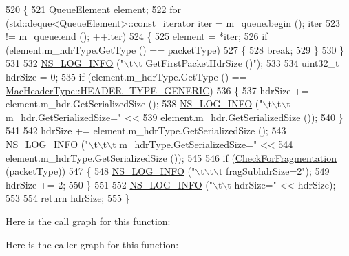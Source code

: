 \begin{DoxyCode}
520 \{
521   QueueElement element;
522   \textcolor{keywordflow}{for} (std::deque<QueueElement>::const\_iterator iter = \hyperlink{classns3_1_1WimaxMacQueue_ad372c20acfe0acf6df6280662d63bdae}{m\_queue}.begin (); iter
523        != \hyperlink{classns3_1_1WimaxMacQueue_ad372c20acfe0acf6df6280662d63bdae}{m\_queue}.end (); ++iter)
524     \{
525       element = *iter;
526       \textcolor{keywordflow}{if} (element.m\_hdrType.GetType () == packetType)
527         \{
528           \textcolor{keywordflow}{break};
529         \}
530     \}
531 
532   \hyperlink{group__logging_gafbd73ee2cf9f26b319f49086d8e860fb}{NS\_LOG\_INFO} (\textcolor{stringliteral}{"\(\backslash\)t\(\backslash\)t GetFirstPacketHdrSize ()"});
533 
534   uint32\_t hdrSize = 0;
535   \textcolor{keywordflow}{if} (element.m\_hdrType.GetType () == \hyperlink{classns3_1_1MacHeaderType_a54d8fc8bc93a2b7865627965cdd31c20a48fe5b2f20cadf78008c71469b518403}{MacHeaderType::HEADER\_TYPE\_GENERIC})
536     \{
537       hdrSize += element.m\_hdr.GetSerializedSize ();
538       \hyperlink{group__logging_gafbd73ee2cf9f26b319f49086d8e860fb}{NS\_LOG\_INFO} (\textcolor{stringliteral}{"\(\backslash\)t\(\backslash\)t\(\backslash\)t m\_hdr.GetSerializedSize="} <<
539                    element.m\_hdr.GetSerializedSize ());
540     \}
541 
542   hdrSize += element.m\_hdrType.GetSerializedSize ();
543   \hyperlink{group__logging_gafbd73ee2cf9f26b319f49086d8e860fb}{NS\_LOG\_INFO} (\textcolor{stringliteral}{"\(\backslash\)t\(\backslash\)t\(\backslash\)t m\_hdrType.GetSerializedSize="} <<
544                element.m\_hdrType.GetSerializedSize ());
545 
546   \textcolor{keywordflow}{if} (\hyperlink{classns3_1_1WimaxMacQueue_aba14f6efd4ebb33ac03afd4bbc1461b6}{CheckForFragmentation} (packetType))
547     \{
548       \hyperlink{group__logging_gafbd73ee2cf9f26b319f49086d8e860fb}{NS\_LOG\_INFO} (\textcolor{stringliteral}{"\(\backslash\)t\(\backslash\)t\(\backslash\)t fragSubhdrSize=2"});
549       hdrSize += 2;
550     \}
551 
552   \hyperlink{group__logging_gafbd73ee2cf9f26b319f49086d8e860fb}{NS\_LOG\_INFO} (\textcolor{stringliteral}{"\(\backslash\)t\(\backslash\)t hdrSize="} << hdrSize);
553 
554   \textcolor{keywordflow}{return} hdrSize;
555 \}
\end{DoxyCode}


Here is the call graph for this function\+:




Here is the caller graph for this function\+:


